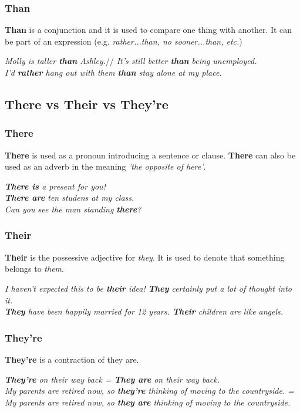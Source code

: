 \documentclass[hidelinks,10pt,a4paper]{article}
\begin{document}
\subsubsection{Than}
\textbf{Than} is a conjunction and it is used to compare one thing with another. It can be part of an expression (e.g. \textit{rather...than, no sooner...than, etc.})
\begin{center}
	\textit{Molly is taller \textbf{than} Ashley.}//
	\textit{It's still better \textbf{than} being unemployed.}\\
	\textit{I'd \textbf{rather} hang out with them \textbf{than} stay alone at my place.}
\end{center}

\subsection{There vs Their vs They're}
\subsubsection{There}
\textbf{There} is used as a pronoun introducing a sentence or clause. \textbf{There} can also be used as an adverb in the meaning \textit{'the opposite of here'}.
\begin{center}
	\textit{\textbf{There is} a present for you!}\\
	\textit{\textbf{There are} ten studens at my class.}\\
	\textit{Can you see the man standing \textbf{there}?}
\end{center}

\subsubsection{Their}
\textbf{Their} is the possessive adjective for \textit{they}. It is used to denote that something belongs to \textit{them}.
\begin{center}
	\textit{I haven't expected this to be \textbf{their} idea! \textbf{They} certainly put a lot of thought into it.}\\
	\textit{\textbf{They} have been happily married for 12 years. \textbf{Their} children are like angels.}
\end{center}

\subsubsection{They're}
\textbf{They're} is a contraction of they are.
\begin{center}
	\textit{\textbf{They're} on their way back = \textbf{They are} on their way back.}\\
	\textit{My parents are retired now, so \textbf{they're} thinking of moving to the countryside. = My parents are retired now, so \textbf{they are} thinking of moving to the countryside.}
\end{center}
\end{document}
